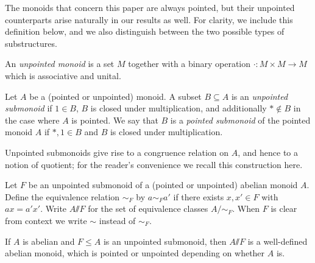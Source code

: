 \documentclass[11pt]{amsart}
\renewcommand{\ss}{\mathord{\sslash}}
\begin{document}
The monoids that concern this paper are always pointed, but their unpointed counterparts arise naturally in our results as well. For clarity, we include this definition below, and we also distinguish between the two possible types of substructures.

\begin{definition}
    An \emph{unpointed monoid} is a set $M$ together with a binary operation $\cdot\colon M\times M\to M$ which is
   associative and unital.
\end{definition}

\begin{definition}
    Let $A$ be a (pointed or unpointed) monoid. A subset $B\subseteq A$ is an \emph{unpointed submonoid} if  $1\in B$,  $B$ is closed under multiplication, and additionally $*\notin B$ in the case where $A$ is pointed. We say that $B$ is a \emph{pointed submonoid} of the pointed monoid $A$ if $*,1\in B$ and $B$ is closed under multiplication.
 \end{definition}

Unpointed submonoids give rise to a congruence relation on $A$, and hence to a notion of quotient; for the reader's convenience we recall this construction here.

\begin{definition} \label{def:ss}
    Let $F$ be an unpointed submonoid of a (pointed or unpointed) abelian monoid $A$.  Define the equivalence relation $\sim_F$ by $a\sim_F a'$ if there exists $x,x'\in F$ with $ax = a'x'$.  Write $A\ss F$ for the set of equivalence classes $A/\sim_F$.  When $F$ is clear from context we write $\sim$ instead of $\sim_F$.
\end{definition}



\begin{lemma}\label{lem.quotientA/F}
   If $A$ is abelian and $F\leq A$ is an unpointed submonoid, then $A\ss F$ is a well-defined abelian monoid, which is pointed or unpointed depending on whether $A$ is.
\end{lemma}
\end{document}

